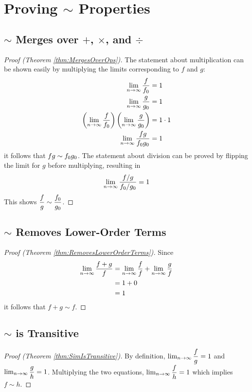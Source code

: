 \appendix
\appendixpage

\section{Proving $\sim$ Properties}

\subsection{$\sim$ Merges over $+$, $\times$, and $\div$}

\begin{proof}[Proof (Theorem \ref{thm:MergesOverOps})]
	
	The statement about multiplication can be shown easily by multiplying the limits corresponding to $f$ and $g$:
	\begin{align*}
	\lim_{n \to \infty} \frac{f}{f_0} &= 1\\
	\lim_{n \to \infty} \frac{g}{g_0} &= 1\\
	\left( \lim_{n \to \infty} \frac{f}{f_0} \right) \left( \lim_{n \to \infty} \frac{g}{g_0} \right) &= 1 \cdot 1\\
	\lim_{n \to \infty} \frac{fg}{f_0g_0} &= 1
	\end{align*}
	it follows that $fg \sim f_0g_0$. The statement about division can be proved by flipping the limit for $g$ before multiplying, resulting in
	\begin{align*}
	\lim_{n \to \infty} \frac{f / g}{f_0 / g_0} = 1
	\end{align*}
	This shows $\dfrac f g \sim \dfrac {f_0} {g_0}$.
\end{proof}

\subsection{$\sim$ Removes Lower-Order Terms}

\begin{proof}[Proof (Theorem \ref{thm:RemovesLowerOrderTerms})]
	Since
	\begin{align*}
	\lim_{n \to \infty} \frac{f + g}{f} &= \lim_{n \to \infty} \frac{f}{f} + \lim_{n \to \infty} \frac{g}{f}\\
	&= 1 + 0\\
	&= 1
	\end{align*}
	it follows that $f + g \sim f$.
\end{proof}

\subsection{$\sim$ is Transitive}

\begin{proof}[Proof (Theorem \ref{thm:SimIsTransitive})]
By definition, $\lim_{n \to \infty} \dfrac f g = 1$ and $\lim_{n \to \infty} \dfrac g h = 1$. Multiplying the two equations, $\lim_{n \to \infty} \dfrac f h = 1$ which implies $f \sim h$.
\end{proof}